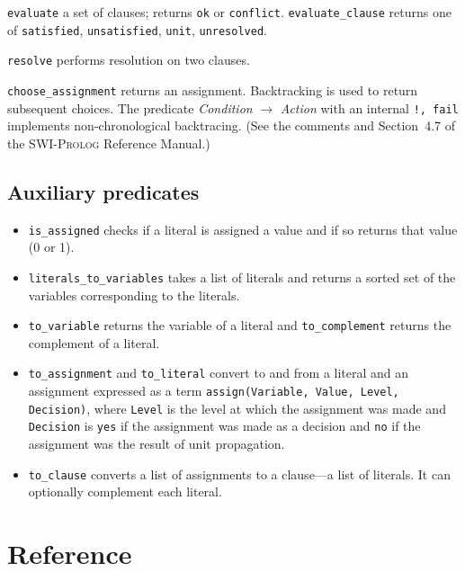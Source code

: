 \documentclass[11pt]{article}
\newcommand*{\p}[1]{\textup{\texttt{#1}}}
\newcommand*{\sw}{\textsc{SWI-Prolog}}
\begin{document}
\p{evaluate} a set of clauses; returns \p{ok} or \p{conflict}.
\p{evaluate\_clause} returns one of \p{satisfied}, \p{unsatisfied},
\p{unit}, \p{unresolved}.

\p{resolve} performs resolution on two clauses.

\p{choose\_assignment} returns an assignment. Backtracking is used to
return subsequent choices. The predicate \emph{Condition} $\rightarrow$
\emph{Action} with an internal \p{!, fail} implements non-chronological
backtracing. (See the comments and Section~4.7 of the \sw{} Reference
Manual.)


\subsection{Auxiliary predicates}\label{s.aux}

\begin{itemize}

\item \p{is\_assigned} checks if a literal is assigned a value
and if so returns that value (0 or 1).

\item \p{literals\_to\_variables} takes a list of literals and returns a
sorted set of the variables corresponding to the literals.

\item \p{to\_variable} returns the variable of a literal and
\p{to\_complement} returns the complement of a literal.

\item \p{to\_assignment} and \p{to\_literal} convert to and from a
literal and an assignment expressed as a term \p{assign(Variable, Value,
Level, Decision)}, where \p{Level} is the level at which the assignment
was made and \p{Decision} is \p{yes} if the assignment was
made as a decision and \p{no} if the assignment was the result of unit
propagation.

\item \p{to\_clause} converts a list of assignments to a clause---a list
of literals. It can optionally complement each literal.

\end{itemize}





\newpage

\appendix
\section{Reference}
\end{document}
